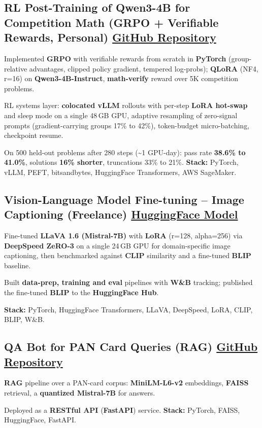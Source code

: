 \documentclass[letter,10pt]{article}
\begin{document}
\subsection{RL Post-Training of Qwen3-4B for Competition Math (GRPO + Verifiable Rewards, Personal) \hfill \href{https://github.com/sunil448832/preference-alignment-grpo}{GitHub Repository}}
\begin{zitemize}
\item Implemented \textbf{GRPO} with verifiable rewards from scratch in \textbf{PyTorch} (group-relative advantages, clipped policy gradient, tempered log-probs); \textbf{QLoRA} (NF4, r=16) on \textbf{Qwen3-4B-Instruct}, \textbf{math-verify} reward over 5K competition problems.
\item RL systems layer: \textbf{colocated vLLM} rollouts with per-step \textbf{LoRA hot-swap} and sleep mode on a single 48\,GB GPU, adaptive resampling of zero-signal prompts (gradient-carrying groups 17\% to 42\%), token-budget micro-batching, checkpoint resume.
\item On 500 held-out problems after 280 steps (\textasciitilde1 GPU-day): pass rate \textbf{38.6\% to 41.0\%}, solutions \textbf{16\% shorter}, truncations 33\% to 21\%. \textbf{Stack:} PyTorch, vLLM, PEFT, bitsandbytes, HuggingFace Transformers, AWS SageMaker.
\end{zitemize}

\subsection{Vision-Language Model Fine-tuning – Image Captioning (Freelance) \hfill \href{https://huggingface.co/sunil448832/blip-model}{HuggingFace Model}}
\begin{zitemize}
\item Fine-tuned \textbf{LLaVA 1.6 (Mistral-7B)} with \textbf{LoRA} (r=128, alpha=256) via \textbf{DeepSpeed ZeRO-3} on a single 24\,GB GPU for domain-specific image captioning, then benchmarked against \textbf{CLIP} similarity and a fine-tuned \textbf{BLIP} baseline.
\item Built \textbf{data-prep, training and eval} pipelines with \textbf{W\&B} tracking; published the fine-tuned \textbf{BLIP} to the \textbf{HuggingFace Hub}.
\item \textbf{Stack:} PyTorch, HuggingFace Transformers, LLaVA, DeepSpeed, LoRA, CLIP, BLIP, W\&B.
\end{zitemize}

\subsection{QA Bot for PAN Card Queries (RAG) \hfill \href{https://github.com/sunil448832/Natural-Language-Processing/tree/master/RAG(Retrieval\%20Augment\%20Generation)}{GitHub Repository}}
\begin{zitemize}
\item \textbf{RAG} pipeline over a PAN-card corpus: \textbf{MiniLM-L6-v2} embeddings, \textbf{FAISS} retrieval, a \textbf{quantized Mistral-7B} for answers.
\item Deployed as a \textbf{RESTful API} (\textbf{FastAPI}) service. \textbf{Stack:} PyTorch, FAISS, HuggingFace, FastAPI.
\end{zitemize}
\end{document}
